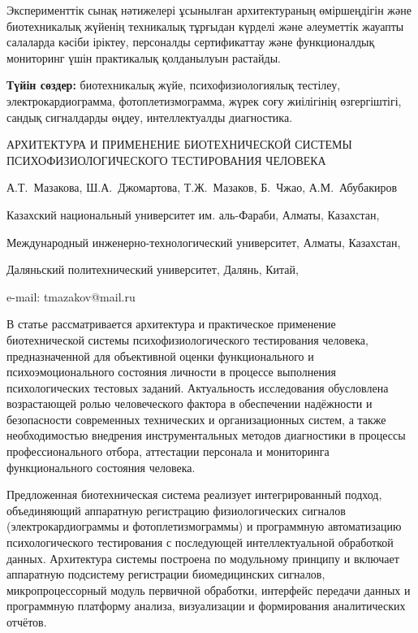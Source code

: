 Эксперименттік сынақ нәтижелері ұсынылған архитектураның өміршеңдігін
және биотехникалық жүйенің техникалық тұрғыдан күрделі және әлеуметтік
жауапты салаларда кәсіби іріктеу, персоналды сертификаттау және
функционалдық мониторинг үшін практикалық қолданылуын растайды.

{\bfseries Түйін сөздер:} биотехникалық жүйе, психофизиологиялық тестілеу,
электрокардиограмма, фотоплетизмограмма, жүрек соғу жиілігінің
өзгергіштігі, сандық сигналдарды өңдеу, интеллектуалды диагностика.

\begin{header}
АРХИТЕКТУРА И ПРИМЕНЕНИЕ БИОТЕХНИЧЕСКОЙ СИСТЕМЫ ПСИХОФИЗИОЛОГИЧЕСКОГО ТЕСТИРОВАНИЯ ЧЕЛОВЕКА

А.Т.~Мазакова,
Ш.А.~Джомартова,
Т.Ж.~Мазаков\envelope,
Б.~Чжао,
А.М.~Абубакиров
\end{header}

\begin{affil}
Казахский национальный университет им. аль-Фараби, Алматы, Казахстан,

Международный инженерно-технологический университет, Алматы, Казахстан,

Даляньский политехнический университет, Далянь, Китай,

e-mail: tmazakov@mail.ru
\end{affil}

В статье рассматривается архитектура и практическое применение
биотехнической системы психофизиологического тестирования человека,
предназначенной для объективной оценки функционального и
психоэмоционального состояния личности в процессе выполнения
психологических тестовых заданий. Актуальность исследования обусловлена
возрастающей ролью человеческого фактора в обеспечении надёжности и
безопасности современных технических и организационных систем, а также
необходимостью внедрения инструментальных методов диагностики в процессы
профессионального отбора, аттестации персонала и мониторинга
функционального состояния человека.

Предложенная биотехническая система реализует интегрированный подход,
объединяющий аппаратную регистрацию физиологических сигналов
(электрокардиограммы и фотоплетизмограммы) и программную автоматизацию
психологического тестирования с последующей интеллектуальной обработкой
данных. Архитектура системы построена по модульному принципу и включает
аппаратную подсистему регистрации биомедицинских сигналов,
микропроцессорный модуль первичной обработки, интерфейс передачи данных
и программную платформу анализа, визуализации и формирования
аналитических отчётов.


